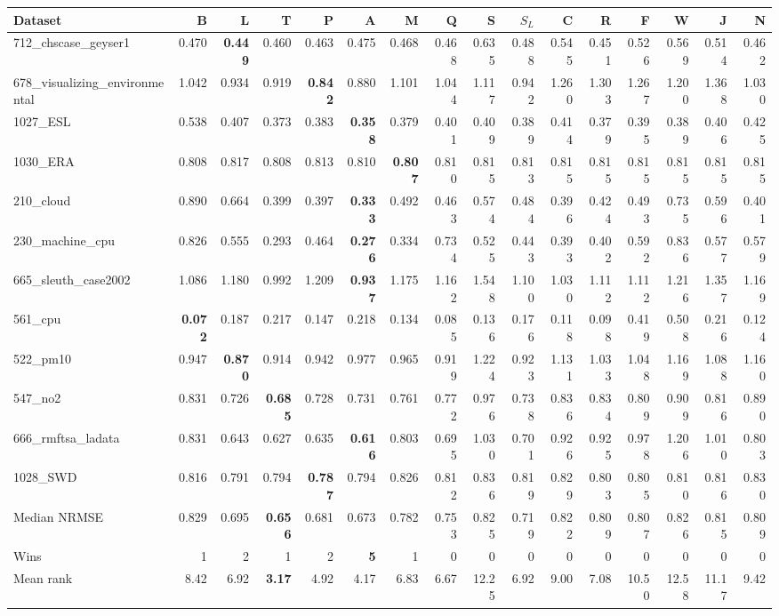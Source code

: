 {\scriptsize\setlength{\tabcolsep}{1pt}
\begin{tabular}{lrrrrrrrrrrrrrrr}
\toprule
Dataset & B & L & T & P & A & M & Q & S & $S_L$ & C & R & F & W & J & N \\
\midrule
712\_chscase\_geyser1 & 0.470 & \textbf{0.449} & 0.460 & 0.463 & 0.475 & 0.468 & 0.468 & 0.635 & 0.488 & 0.545 & 0.451 & 0.526 & 0.569 & 0.514 & 0.462 \\
678\_visualizing\_environmental & 1.042 & 0.934 & 0.919 & \textbf{0.842} & 0.880 & 1.101 & 1.044 & 1.117 & 0.942 & 1.260 & 1.303 & 1.267 & 1.200 & 1.368 & 1.030 \\
1027\_ESL & 0.538 & 0.407 & 0.373 & 0.383 & \textbf{0.358} & 0.379 & 0.401 & 0.409 & 0.389 & 0.414 & 0.379 & 0.395 & 0.389 & 0.406 & 0.425 \\
1030\_ERA & 0.808 & 0.817 & 0.808 & 0.813 & 0.810 & \textbf{0.807} & 0.810 & 0.815 & 0.813 & 0.815 & 0.815 & 0.815 & 0.815 & 0.815 & 0.815 \\
210\_cloud & 0.890 & 0.664 & 0.399 & 0.397 & \textbf{0.333} & 0.492 & 0.463 & 0.574 & 0.484 & 0.396 & 0.424 & 0.493 & 0.735 & 0.596 & 0.401 \\
230\_machine\_cpu & 0.826 & 0.555 & 0.293 & 0.464 & \textbf{0.276} & 0.334 & 0.734 & 0.525 & 0.443 & 0.393 & 0.402 & 0.592 & 0.836 & 0.577 & 0.579 \\
665\_sleuth\_case2002 & 1.086 & 1.180 & 0.992 & 1.209 & \textbf{0.937} & 1.175 & 1.162 & 1.548 & 1.100 & 1.030 & 1.112 & 1.112 & 1.216 & 1.357 & 1.169 \\
561\_cpu & \textbf{0.072} & 0.187 & 0.217 & 0.147 & 0.218 & 0.134 & 0.085 & 0.136 & 0.176 & 0.118 & 0.098 & 0.419 & 0.508 & 0.216 & 0.124 \\
522\_pm10 & 0.947 & \textbf{0.870} & 0.914 & 0.942 & 0.977 & 0.965 & 0.919 & 1.224 & 0.923 & 1.131 & 1.033 & 1.048 & 1.169 & 1.088 & 1.160 \\
547\_no2 & 0.831 & 0.726 & \textbf{0.685} & 0.728 & 0.731 & 0.761 & 0.772 & 0.976 & 0.738 & 0.836 & 0.834 & 0.809 & 0.909 & 0.816 & 0.890 \\
666\_rmftsa\_ladata & 0.831 & 0.643 & 0.627 & 0.635 & \textbf{0.616} & 0.803 & 0.695 & 1.030 & 0.701 & 0.926 & 0.925 & 0.978 & 1.206 & 1.010 & 0.803 \\
1028\_SWD & 0.816 & 0.791 & 0.794 & \textbf{0.787} & 0.794 & 0.826 & 0.812 & 0.836 & 0.819 & 0.829 & 0.803 & 0.805 & 0.810 & 0.816 & 0.830 \\
\midrule
Median NRMSE & 0.829 & 0.695 & \textbf{0.656} & 0.681 & 0.673 & 0.782 & 0.753 & 0.825 & 0.719 & 0.822 & 0.809 & 0.807 & 0.826 & 0.815 & 0.809 \\
Wins & 1 & 2 & 1 & 2 & \textbf{5} & 1 & 0 & 0 & 0 & 0 & 0 & 0 & 0 & 0 & 0 \\
Mean rank & 8.42 & 6.92 & \textbf{3.17} & 4.92 & 4.17 & 6.83 & 6.67 & 12.25 & 6.92 & 9.00 & 7.08 & 10.50 & 12.58 & 11.17 & 9.42 \\
\bottomrule
\end{tabular}
}
